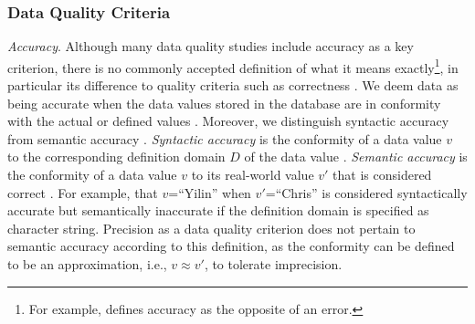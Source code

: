 \subsubsection{Data Quality Criteria} 

\textit{Accuracy}.
Although many data quality studies include accuracy as a key criterion, there is no commonly accepted definition of what it means exactly\footnote{For example, \citet{Gelbstein2003} defines accuracy as the opposite of an error.}, in particular its difference to quality criteria such as correctness \citep{Wand1996, Price2005}. 
We deem data as being accurate when the data values stored in the database are in conformity with the actual or defined values \citep{Ballou1985, Fox1994}. Moreover, we distinguish syntactic accuracy from semantic accuracy \citep{Scannapieco2005,Batini2009}. 
\textit{Syntactic accuracy} is the conformity of a data value $v$ to the corresponding definition domain $D$ of the data value \citep{Batini2009}. 
\textit{Semantic accuracy} is the conformity of a data value $v$ to its real-world value $v'$ that is considered correct \citep{Fox1994,Redman1996,Batini2009}. For example, that $v$=``Yilin'' when $v'$=``Chris'' is considered syntactically accurate but semantically inaccurate if the definition domain is specified as character string. Precision as a data quality criterion does not pertain to semantic accuracy according to this definition, as the conformity can be defined to be an approximation, i.e., $v\approx v'$, to tolerate imprecision. 

